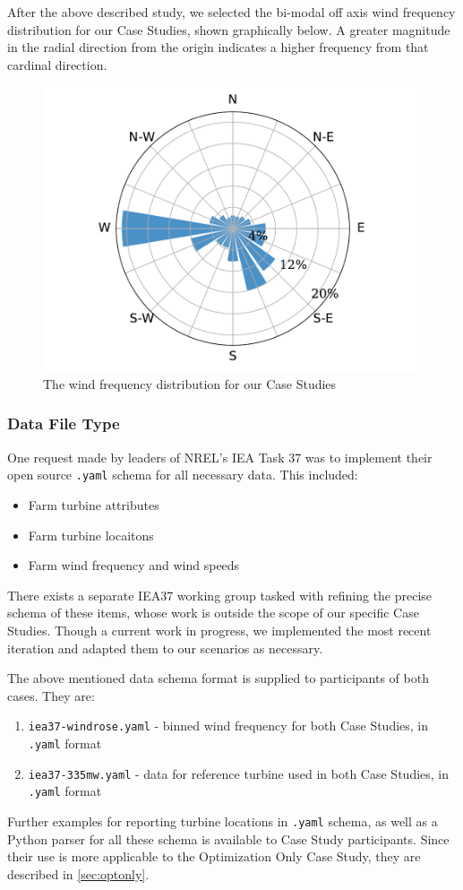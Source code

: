 	After the above described study, we selected the bi-modal off axis wind frequency distribution for our Case Studies, shown graphically below.
	A greater magnitude in the radial direction from the origin indicates a higher frequency from that cardinal direction.
	
	\begin{figure}[H]
		\centering \includegraphics[width=.5\textwidth]{./figures/windrose.pdf}
		\caption{The wind frequency distribution for our Case Studies}
		\label{fig:freqdist}
	\end{figure}

\subsubsection{Data File Type} \label{sec:filetypes}
	One request made by leaders of NREL's IEA Task 37 was to implement their open source \texttt{.yaml} schema for all necessary data.
	This included:
	\begin{itemize}
		\item{Farm turbine attributes}
		\item{Farm turbine locaitons}
		\item{Farm wind frequency and wind speeds}
	\end{itemize}

	There exists a separate IEA37 working group tasked with refining the precise schema of these items, whose work is outside the scope of our specific Case Studies.
	Though a current work in progress, we implemented the most recent iteration and adapted them to our scenarios as necessary.

	The above mentioned data schema format is supplied to participants of both cases. They are:
	\begin{enumerate}
		\item \texttt{iea37-windrose.yaml} - binned wind frequency for both Case Studies, in \texttt{.yaml} format
		\item \texttt{iea37-335mw.yaml} - data for reference turbine used in both Case Studies, in \texttt{.yaml} format
	\end{enumerate}

	Further examples for reporting turbine locations in \texttt{.yaml} schema, as well as a Python parser for all these schema is available to Case Study participants.
	Since their use is more applicable to the Optimization Only Case Study, they are described in \cref{sec:optonly}.